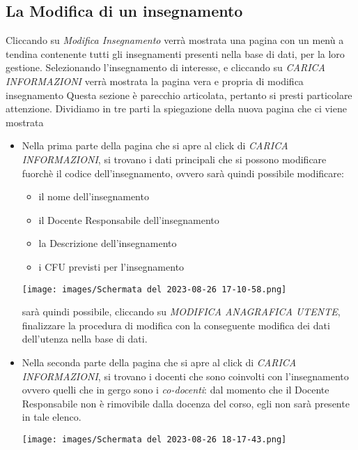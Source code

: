 \documentclass{article}
\begin{document}
    \subsection{La Modifica di un insegnamento}
    Cliccando su \textit{Modifica Insegnamento} verrà mostrata una pagina con un menù a tendina contenente tutti gli insegnamenti presenti nella base di dati, per la loro gestione. Selezionando l'insegnamento di interesse, e cliccando su \textit{CARICA INFORMAZIONI} verrà mostrata la pagina vera e propria di modifica insegnamento
    Questa sezione è parecchio articolata, pertanto si presti particolare attenzione.
    Dividiamo in tre parti la spiegazione della nuova pagina che ci viene mostrata
    \begin{itemize}
        \item Nella prima parte della pagina che si apre al click di \textit{CARICA INFORMAZIONI}, si trovano i dati principali che si possono modificare fuorchè il codice dell'insegnamento, ovvero sarà quindi possibile modificare:
        \begin{itemize}
            \item il nome dell'insegnamento
            \item il Docente Responsabile dell'insegnamento
            \item la Descrizione dell'insegnamento
            \item i CFU previsti per l'insegnamento
        \end{itemize}

        \begin{center}
            \texttt{[image: images/Schermata del 2023-08-26 17-10-58.png]}
        \end{center}

        sarà quindi possibile, cliccando su \textit{MODIFICA ANAGRAFICA UTENTE}, finalizzare la procedura di modifica con la conseguente modifica dei dati dell'utenza nella base di dati.

        \item Nella seconda parte della pagina che si apre al click di \textit{CARICA INFORMAZIONI}, si trovano i docenti che sono coinvolti con l'insegnamento ovvero quelli che in gergo sono i \textit{co-docenti}: dal momento che il Docente Responsabile non è rimovibile dalla docenza del corso, egli non sarà presente in tale elenco.

        \begin{center}
            \texttt{[image: images/Schermata del 2023-08-26 18-17-43.png]}
        \end{center}


\end{itemize}
\end{document}
